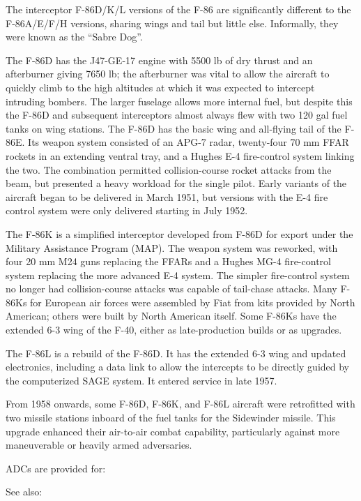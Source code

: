 The interceptor F-86D/K/L versions of the F-86 are significantly different to the F-86A/E/F/H versions, sharing wings and tail but little else. Informally, they were known as the “Sabre Dog”.

The F-86D has the J47-GE-17 engine with 5500 lb of dry thrust and an afterburner giving 7650 lb; the afterburner was vital to allow the aircraft to quickly climb to the high altitudes at which it was expected to intercept intruding bombers. The larger fuselage allows more internal fuel, but despite this the F-86D and subsequent interceptors almost always flew with two 120 gal fuel tanks on wing stations. The F-86D has the basic wing and all-flying tail of the F-86E. Its weapon system consisted of an APG-7 radar, twenty-four 70 mm FFAR rockets in an extending ventral tray, and a Hughes E-4 fire-control system linking the two. The combination permitted collision-course rocket attacks from the beam, but presented a heavy workload for the single pilot. Early variants of the aircraft began to be delivered in March 1951, but versions with the E-4 fire control system were only delivered starting in July 1952.

The F-86K is a simplified interceptor developed from F-86D for export under the Military Assistance Program (MAP). The weapon system was reworked, with four 20 mm M24 guns replacing the FFARs and a Hughes MG-4 fire-control system replacing the more advanced E-4 system. The simpler fire-control system no longer had collision-course attacks was capable of tail-chase attacks. Many F-86Ks for European air forces were assembled by Fiat from kits provided by North American; others were built by North American itself. Some F-86Ks have the extended 6-3 wing of the F-40, either as late-production builds or as upgrades. 

The F-86L is a rebuild of the F-86D. It has the extended 6-3 wing and updated electronics, including a data link to allow the  intercepts to be directly guided by the computerized SAGE system. It entered service in late 1957.

From 1958 onwards, some F-86D, F-86K, and F-86L aircraft were retrofitted with two missile stations inboard of the fuel tanks for the Sidewinder missile. This upgrade enhanced their air-to-air combat capability, particularly against more maneuverable or heavily armed adversaries.


ADCs are provided for:
\begin{adclist}
\end{adclist}

\pagebreak
See also:
\begin{typelist}
\end{typelist}